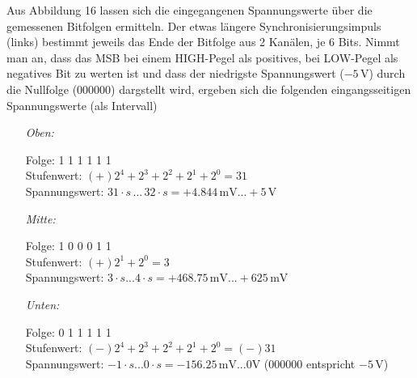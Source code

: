\documentclass[a4paper, 12pt]{article}
\begin{document}
Aus Abbildung 16 lassen sich die eingegangenen Spannungswerte über die
gemessenen Bitfolgen
ermitteln. Der etwas längere Synchronisierungsimpuls (links) bestimmt jeweils das Ende
der Bitfolge aus 2 Kanälen, je $6$ Bits.
Nimmt man an, dass das MSB bei einem HIGH-Pegel als positives, bei LOW-Pegel als
negatives Bit zu werten ist und dass der niedrigste Spannungswert
($-5\,\si{\volt}$) durch die Nullfolge (000000) dargstellt wird, ergeben sich
die folgenden eingangsseitigen Spannungswerte (als Intervall)

\begin{enumerate}
  \item[\textit{Oben:}]
    \begin{enumerate}
      Folge: 1 1 1 1 1 1\\
      Stufenwert: $(+)2^4+2^3+2^2+2^1+2^0=31$\\
      Spannungswert:  $31 \cdot s \, ... \, 32 \cdot s= +4.844 \,\si{\milli\volt}
      ... +5\,\si{\volt}$ 
    \end{enumerate}

  \item[\textit{Mitte:}]
    \begin{enumerate}
      Folge: 1 0 0 0 1 1\\
      Stufenwert: $(+)2^1+2^0 = 3$\\
      Spannungswert: $ 3 \cdot s ... 4 \cdot s = +468.75\,\si{\milli\volt}...+625\,\si{\milli\volt}$
    \end{enumerate}

  \item[\textit{Unten:}]
    \begin{enumerate}
      Folge: 0 1 1 1 1 1\\
      Stufenwert: $(-) 2^4+2^3+2^2+2^1+2^0 = (-)31$\\
      Spannungswert: $-1\cdot s ... 0 \cdot s = -156.25 \,\si{\milli\volt}...0
      \si{\volt}$ (000000 entspricht $-5 \,\si{\volt}$)
    \end{enumerate}

\end{enumerate}

\end{document}
